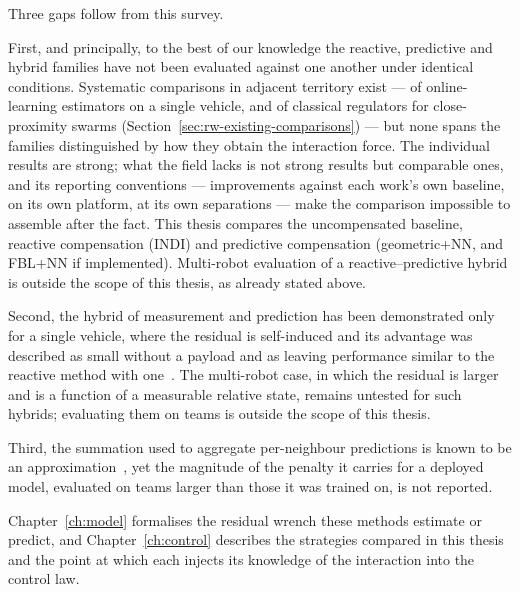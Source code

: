 Three gaps follow from this survey.

First, and principally, to the best of our knowledge the reactive, predictive and hybrid families
have not been evaluated against one another under identical conditions. Systematic comparisons in
adjacent territory exist --- of online-learning estimators on a single vehicle, and of classical
regulators for close-proximity swarms (Section~\ref{sec:rw-existing-comparisons}) --- but none
spans the families distinguished by how they obtain the interaction force. The individual results are strong; what the field lacks is not strong results
but comparable ones, and its reporting conventions --- improvements against each work's own
baseline, on its own platform, at its own separations --- make the comparison impossible to
assemble after the fact. This thesis compares the uncompensated baseline, reactive compensation
(INDI) and predictive compensation (geometric+NN, and FBL+NN if implemented). Multi-robot
evaluation of a reactive--predictive hybrid is outside the scope of this thesis, as already stated
above.

Second, the hybrid of measurement and prediction has been demonstrated only for a single vehicle,
where the residual is self-induced and its advantage was described as small without a payload and
as leaving performance similar to the reactive method with one~\cite{cobobriesewitz2026lindi}. The
multi-robot case, in which the residual is larger and is a function of a measurable relative state,
remains untested for such hybrids; evaluating them on teams is outside the scope of this thesis.

Third, the summation used to aggregate per-neighbour predictions is known to be an
approximation~\cite{shi2020neuralswarm,gielis2023aggregate}, yet the magnitude of the penalty it
carries for a deployed model, evaluated on teams larger than those it was trained on, is not
reported.


Chapter~\ref{ch:model} formalises the residual wrench these methods estimate or predict, and
Chapter~\ref{ch:control} describes the strategies compared in this thesis and the point at
which each injects its knowledge of the interaction into the control law.
